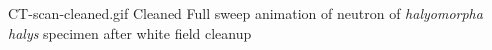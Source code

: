 \documentclass[../main.tex]{subfiles}%
\begin{document}
%
    \Xsupplement%
    \begin{supplement}%
        \supplementcaption%
            {CT-scan-cleaned.gif}%
            {Cleaned }%
            {Full sweep animation of neutron  of \textit{halyomorpha halys} specimen after white field cleanup}%
        \label{sup:ct-scan-cleaned}%
    \end{supplement}%
\end{document}
